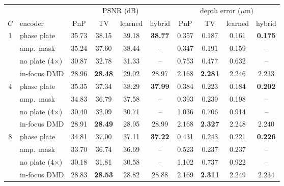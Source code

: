 \begin{tabular}{@{}cl cccc cccc@{}}\toprule
 & & \multicolumn{4}{c}{PSNR (dB)} & \multicolumn{4}{c}{depth error ($\mu$m)}\\
\cmidrule(lr){3-6}\cmidrule(l){7-10}
$C$ & encoder & PnP & TV & learned & hybrid & PnP & TV & learned & hybrid\\\midrule
1 & phase plate & 35.73 & 38.15 & 39.18 & \textbf{38.77} & 0.357 & 0.187 & 0.161 & \textbf{0.175}\\
 & amp.\ mask & 35.24 & 37.60 & 38.44 & -- & 0.347 & 0.191 & 0.159 & --\\
 & no plate (4$\times$) & 30.87 & 32.78 & 31.33 & -- & 0.753 & 0.477 & 0.632 & --\\
 & in-focus DMD & 28.96 & \textbf{28.48} & 29.02 & 28.97 & 2.168 & \textbf{2.281} & 2.246 & 2.233\\
\midrule
4 & phase plate & 35.35 & 37.34 & 38.29 & \textbf{37.99} & 0.384 & 0.223 & 0.184 & \textbf{0.202}\\
 & amp.\ mask & 34.83 & 36.79 & 37.58 & -- & 0.393 & 0.239 & 0.198 & --\\
 & no plate (4$\times$) & 30.40 & 32.09 & 30.71 & -- & 1.036 & 0.706 & 0.914 & --\\
 & in-focus DMD & 28.91 & \textbf{28.49} & 28.95 & 28.99 & 2.168 & \textbf{2.327} & 2.248 & 2.240\\
\midrule
8 & phase plate & 34.81 & 37.00 & 37.11 & \textbf{37.22} & 0.431 & 0.243 & 0.221 & \textbf{0.226}\\
 & amp.\ mask & 33.70 & 36.74 & 36.69 & -- & 0.523 & 0.237 & 0.237 & --\\
 & no plate (4$\times$) & 30.18 & 31.81 & 30.58 & -- & 1.102 & 0.737 & 0.922 & --\\
 & in-focus DMD & 28.83 & \textbf{28.53} & 28.82 & 28.88 & 2.169 & \textbf{2.311} & 2.249 & 2.234\\
\bottomrule\end{tabular}
